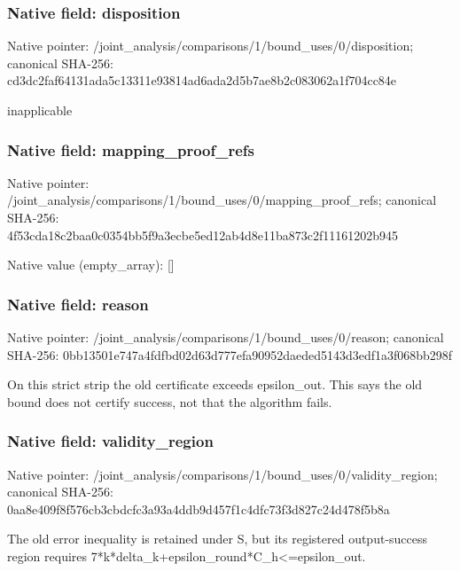 \documentclass[10pt,a4paper]{article}
\begin{document}
\subsubsection{Native field: disposition}
Native pointer: /joint\_\allowbreak{}analysis/comparisons/1/bound\_\allowbreak{}uses/0/disposition; canonical SHA-256: cd3dc2faf64131ada5c13311e93814ad6ada2d5b7ae8b2c083062a1f704cc84e

\begingroup\raggedright\sloppy inapplicable\par\endgroup

\subsubsection{Native field: mapping\_\allowbreak{}proof\_\allowbreak{}refs}
Native pointer: /joint\_\allowbreak{}analysis/comparisons/1/bound\_\allowbreak{}uses/0/mapping\_\allowbreak{}proof\_\allowbreak{}refs; canonical SHA-256: 4f53cda18c2baa0c0354bb5f9a3ecbe5ed12ab4d8e11ba873c2f11161202b945

Native value (empty\_\allowbreak{}array): []

\subsubsection{Native field: reason}
Native pointer: /joint\_\allowbreak{}analysis/comparisons/1/bound\_\allowbreak{}uses/0/reason; canonical SHA-256: 0bb13501e747a4fdfbd02d63d777efa90952daeded5143d3edf1a3f068bb298f

\begingroup\raggedright\sloppy On this strict strip the old certificate exceeds epsilon\_\allowbreak{}out. This says the old bound does not certify success,\allowbreak{} not that the algorithm fails.\par\endgroup

\subsubsection{Native field: validity\_\allowbreak{}region}
Native pointer: /joint\_\allowbreak{}analysis/comparisons/1/bound\_\allowbreak{}uses/0/validity\_\allowbreak{}region; canonical SHA-256: 0aa8e409f8f576cb3cbdcfc3a93a4ddb9d457f1c4dfc73f3d827c24d478f5b8a

\begingroup\raggedright\sloppy The old error inequality is retained under S,\allowbreak{} but its registered output-success region requires 7*k*delta\_\allowbreak{}k+epsilon\_\allowbreak{}round*C\_\allowbreak{}h<=\allowbreak{}epsilon\_\allowbreak{}out.\par\endgroup
\end{document}
